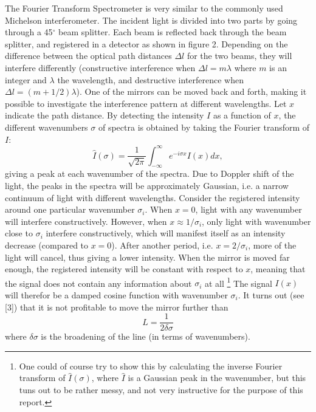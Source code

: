 \documentclass[a4paper]{article}
\begin{document}
The Fourier Transform Spectrometer is very similar to the commonly used Michelson interferometer. The incident light is divided into two parts by going through a 45$^\circ$ beam splitter. Each beam is reflected back through the beam splitter, and registered in a detector as shown in figure 2. Depending on the difference between the optical path distances $\Delta l$ for the two beams, they will interfere differently (constructive interference when $\Delta l = m \lambda$ where $m$ is an integer and $\lambda$ the wavelength, and destructive interference when $\Delta l = (m+ 1/2) \lambda$). One of the mirrors can be moved back and forth, making it possible to investigate the interference pattern at different wavelengths. Let $x$ indicate the path distance. By detecting the intensity $I$ as a function of $x$, the different wavenumbers $\sigma$ of spectra is obtained by taking the Fourier transform of $I$:
\begin{equation}
\hat{I}(\sigma ) = \frac{1}{\sqrt{2\pi }} \int_{-\infty}^{\infty} e^{-i\sigma x} I(x) dx,
\end{equation}
giving a peak at each wavenumber of the spectra. Due to Doppler shift of the light, the peaks in the spectra will be approximately Gaussian, i.e. a narrow continuum of light with different wavelengths. Consider the registered intensity around one particular wavenumber $\sigma_i$. When $x=0$, light with any wavenumber will interfere constructively. However, when $x\approx 1/ \sigma_i$, only light with wavenumber close to $\sigma_i$ interfere constructively, which will manifest itself as an intensity decrease (compared to $x=0$). After another period, i.e. $x=2/\sigma_i$, more of the light will cancel, thus giving a lower intensity. When the mirror is moved far enough, the registered intensity will be constant with respect to $x$, meaning that the signal does not contain any information about $\sigma_i$ at all \footnote{One could of course try to show this by calculating the inverse Fourier transform of $\hat{I}(\sigma)$, where $\hat{I}$ is a Gaussian peak in the wavenumber, but this tuns out to be rather messy, and not very instructive for the purpose of this report.} The signal $I(x)$ will therefor be a damped cosine function with wavenumber $\sigma_i$. It turns out (see [3]) that it is not profitable to move the mirror further than
\begin{equation}
L = \frac{1}{2 \delta \sigma}		%
\end{equation}
where $\delta \sigma$ is the broadening of the line (in terms of wavenumbers). 
\end{document}
